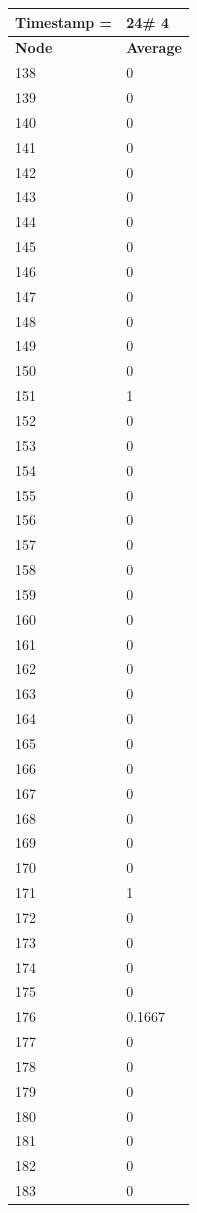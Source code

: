 \begin{tabular}{|l||l|}
\hline
\textbf{Timestamp =} & \textbf{24}\# 4\\\hline
	\textbf{Node} & \textbf{Average} \\ \hline
\hline
	138 & 0 \\ \hline
	139 & 0 \\ \hline
	140 & 0 \\ \hline
	141 & 0 \\ \hline
	142 & 0 \\ \hline
	143 & 0 \\ \hline
	144 & 0 \\ \hline
	145 & 0 \\ \hline
	146 & 0 \\ \hline
	147 & 0 \\ \hline
	148 & 0 \\ \hline
	149 & 0 \\ \hline
	150 & 0 \\ \hline
	151 & 1 \\ \hline
	152 & 0 \\ \hline
	153 & 0 \\ \hline
	154 & 0 \\ \hline
	155 & 0 \\ \hline
	156 & 0 \\ \hline
	157 & 0 \\ \hline
	158 & 0 \\ \hline
	159 & 0 \\ \hline
	160 & 0 \\ \hline
	161 & 0 \\ \hline
	162 & 0 \\ \hline
	163 & 0 \\ \hline
	164 & 0 \\ \hline
	165 & 0 \\ \hline
	166 & 0 \\ \hline
	167 & 0 \\ \hline
	168 & 0 \\ \hline
	169 & 0 \\ \hline
	170 & 0 \\ \hline
	171 & 1 \\ \hline
	172 & 0 \\ \hline
	173 & 0 \\ \hline
	174 & 0 \\ \hline
	175 & 0 \\ \hline
	176 & 0.1667 \\ \hline
	177 & 0 \\ \hline
	178 & 0 \\ \hline
	179 & 0 \\ \hline
	180 & 0 \\ \hline
	181 & 0 \\ \hline
	182 & 0 \\ \hline
	183 & 0 \\ \hline
\end{tabular}
